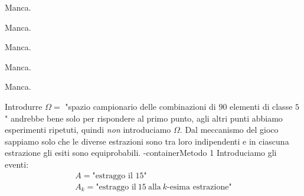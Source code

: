 Manca.
\Soluzione

Manca.
\Soluzione

Manca.
\Soluzione

Manca.
\Soluzione

Manca.
\Soluzione

Introdurre $\Omega =$ "spazio campionario delle combinazioni di $90$ elementi di classe $5$" andrebbe bene solo per rispondere al primo punto, agli altri punti abbiamo esperimenti ripetuti, quindi \textit{non} introduciamo $\Omega $. Dal meccanismo del gioco sappiamo solo che le diverse estrazioni sono tra loro indipendenti e in ciascuna estrazione gli esiti sono equiprobabili.
\boxed-container{Metodo 1}
Introduciamo gli eventi:
\begin{gather*}
A=\text{"estraggo il 15"}\\
A_{k} =\text{"estraggo il} \ 15\ \text{alla} \ k\text{-esima estrazione"}
\end{gather*}
